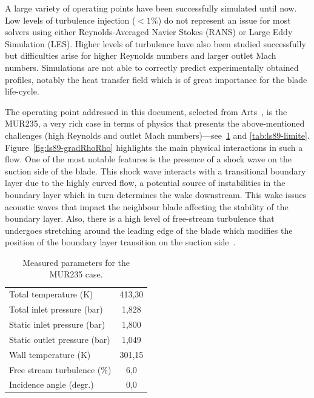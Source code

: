 A large variety of operating points have been successfully simulated until now. Low levels of turbulence injection ($<1$\%) do not represent an issue for most solvers \cite{Gourdain2010,emory2016} using either Reynolds-Averaged Navier Stokes (RANS) or Large Eddy Simulation (LES). Higher levels of turbulence have also been studied successfully~\cite{Wheeler2015} but difficulties arise for higher Reynolds numbers and larger outlet Mach numbers. Simulations are not able to correctly predict experimentally obtained profiles, notably the heat transfer field which is of great importance for the blade life-cycle.

The operating point addressed in this document, selected from Arts~\cite{arts1990}, is the MUR235, a very rich case in terms of physics that presents the above-mentioned challenges (high Reynolds and outlet Mach numbers)---see~\cref{tab:ls89-param} and \cref{tab:ls89-limite}. Figure~\ref{fig:ls89-gradRhoRho} highlights the main physical interactions in such a flow. One of the most notable features is the presence of a shock wave on the suction side of the blade. This shock wave interacts with a transitional boundary layer due to the highly curved flow, a potential source of instabilities in the boundary layer which in turn determines the wake downstream. This wake issues acoustic waves that impact the neighbour blade affecting the stability of the boundary layer. Also, there is a high level of free-stream turbulence that undergoes stretching around the leading edge of the blade which modifies the position of the boundary layer transition on the suction side~\cite{Segui2017a}.


\begin{table}[!ht]
\centering
\begin{tabular}{lc}
\toprule
Total temperature (K)&413,30 \\
Total inlet pressure (bar)&1,828 \\
Static inlet pressure (bar)&1,800 \\
Static outlet pressure (bar)&1,049 \\
Wall temperature (K)&301,15 \\
Free stream turbulence (\%)&6,0 \\
Incidence angle (degr.)&0,0 \\
\bottomrule
\end{tabular}
\caption{Measured parameters for the MUR235 case.}
\label{tab:ls89-param}
\end{table}

